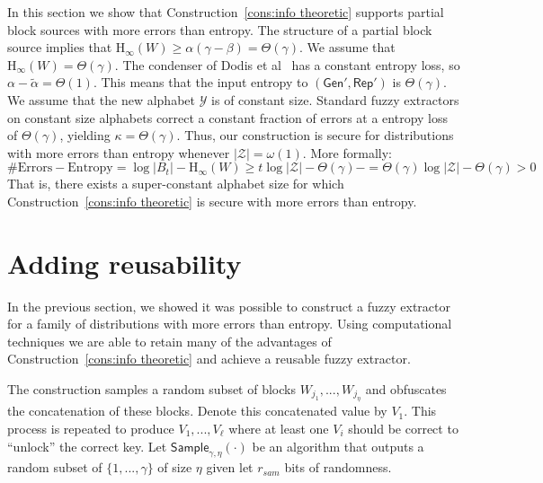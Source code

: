 \documentclass[11pt]{article}
\newcommand{\consref}[1]{\mbox{Construction~\ref{#1}}}
\newcommand{\class}[1]{{\ensuremath{\mathsf{#1}}}}
\newcommand{\gen}{\ensuremath{\class{Gen}}\xspace}
\newcommand{\rep}{\ensuremath{\class{Rep}}\xspace}
\newcommand{\sample}{\ensuremath{\class{Sample}}\xspace}
\newcommand{\Hoo}{\mathrm{H}_\infty}
\begin{document}
In this section we show that \consref{cons:info theoretic} supports partial block sources with more errors than entropy.  The structure of a partial block source implies that  $\Hoo(W) \ge \alpha (\gamma-\beta ) = \Theta(\gamma)$.  We assume that $\Hoo(W) = \Theta(\gamma)$. The condenser of Dodis et al~\cite{dodis2014key} has a constant entropy loss, so $\alpha-\tilde{\alpha} = \Theta(1)$. This means that the input entropy to $(\gen', \rep')$ is $\Theta(\gamma)$.   We assume that the new alphabet $\mathcal{Y}$ is of constant size.  Standard fuzzy extractors on constant size alphabets correct a constant fraction of errors at a entropy loss of $\Theta(\gamma)$, yielding $\kappa = \Theta(\gamma)$.  Thus, our construction is secure for distributions with more errors than entropy whenever $|\mathcal{Z}| = \omega(1)$.
More formally:
\[
\text{\# Errors} - \text{Entropy} = \log |B_t| - \Hoo(W) \ge  t \log |\mathcal{Z}| - \Theta(\gamma)-= \Theta(\gamma) \log |\mathcal{Z}| - \Theta(\gamma)  > 0
\]
That is, there exists a super-constant alphabet size for which \consref{cons:info theoretic} is secure with more errors than entropy.

\section{Adding reusability}
\label{sec:sampling}
In the previous section, we showed it was possible to construct a fuzzy extractor for a family of distributions with more errors than entropy.  Using computational techniques we are able to retain many of the advantages of \consref{cons:info theoretic} and achieve a reusable fuzzy extractor.

The construction samples a random subset of blocks $W_{j_1},..., W_{j_\eta}$ and obfuscates the concatenation of these blocks.  Denote this concatenated value by $V_1$.  This process is repeated to produce $V_1,..., V_\ell$ where at least one $V_i$ should be correct to ``unlock'' the correct key.
Let $\sample_{\gamma, \eta}(\cdot)$ be an algorithm that  outputs a random subset of $\{1,..., \gamma\}$ of size $\eta$ given let $r_{sam}$ bits of randomness.
\end{document}
